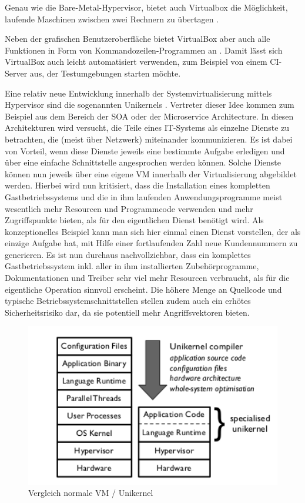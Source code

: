 Genau wie die Bare-Metal-Hypervisor, bietet auch Virtualbox die Möglichkeit, laufende Maschinen zwischen zwei Rechnern zu übertagen \citep[Vgl.][S. 111]{Oracle14}.

Neben der grafischen Benutzeroberfläche bietet VirtualBox aber auch alle Funktionen in Form von Kommandozeilen-Programmen an \citep[Vgl.][S. 113]{Oracle14}. Damit lässt sich VirtualBox auch leicht automatisiert verwenden, zum Beispiel von einem \ac{CI}-Server aus, der Testumgebungen starten möchte.


Eine relativ neue Entwicklung innerhalb der Systemvirtualisierung mittels Hypervisor sind die sogenannten Unikernels \citep[Vgl.][Abstract und Introduction]{MadMorAnd13}. Vertreter dieser Idee kommen zum Beispiel aus dem Bereich der \ac{SOA} oder der Microservice Architecture. In diesen Architekturen wird versucht, die Teile eines IT-Systems als einzelne Dienste zu betrachten, die (meist über Netzwerk) miteinander kommunizieren. Es ist dabei von Vorteil, wenn diese Dienste jeweils eine bestimmte Aufgabe erledigen und über eine einfache Schnittstelle angesprochen werden können. Solche Dienste können nun jeweils über eine eigene \ac{VM} innerhalb der Virtualisierung abgebildet werden. Hierbei wird nun kritisiert, dass die Installation eines kompletten Gastbetriebssystems und die in ihm laufenden Anwendungsprogramme meist wesentlich mehr Resourcen und Programmcode verwenden und mehr Zugriffspunkte bieten, als für den eigentlichen Dienst benötigt wird. Als konzeptionelles Beispiel kann man sich hier einmal einen Dienst vorstellen, der als einzige Aufgabe hat, mit Hilfe einer fortlaufenden Zahl neue Kundennummern zu generieren. Es ist nun durchaus nachvollziehbar, dass ein komplettes Gastbetriebssystem inkl. aller in ihm installierten Zubehörprogramme, Dokumentationen und Treiber sehr viel mehr Resourcen verbraucht, als für die eigentliche Operation sinnvoll erscheint. Die höhere Menge an Quellcode und typische Betriebssystemschnittstellen stellen zudem auch ein erhötes Sicherheitsrisiko dar, da sie potentiell mehr Angriffsvektoren bieten.

\begin{figure}[!ht]
  \begin{center}
    \includegraphics[width=12cm]{bilder/comparison-vm-unikernel.png}
    \caption{Vergleich normale VM / Unikernel \citep[Abb. 1]{MadMorAnd13}}
    \label{unikernel}
  \end{center}
\end{figure}

